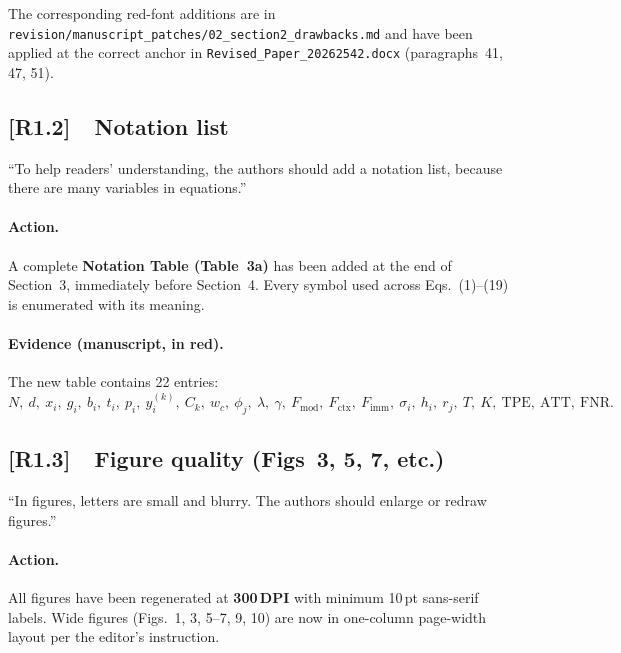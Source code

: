 \documentclass[11pt,a4paper]{article}
\newcommand{\cid}[1]{\textcolor{revred}{\textbf{[#1]}}}
\newcommand{\filebox}[1]{\texttt{\small #1}}
\newcommand{\sectref}[1]{Section~#1}
\newcommand{\stress}[1]{\textbf{#1}}
\begin{document}
\noindent The corresponding red-font additions are in \filebox{revision/manuscript\_patches/02\_section2\_drawbacks.md} and have been applied at the correct anchor in \filebox{Revised\_Paper\_20262542.docx} (paragraphs~41, 47, 51).

\subsection*{\cid{R1.2}~~Notation list}

\begin{reviewerquote}
``To help readers' understanding, the authors should add a notation list, because there are many variables in equations.''
\end{reviewerquote}

\paragraph{Action.} A complete \stress{Notation Table (Table~3a)} has been added at the end of \sectref{3}, immediately before \sectref{4}. Every symbol used across Eqs.~(1)--(19) is enumerated with its meaning.

\paragraph{Evidence (manuscript, in red).} The new table contains 22 entries:
\[
N,\ d,\ x_i,\ g_i,\ b_i,\ t_i,\ p_i,\ y_i^{(k)},\ C_k,\ w_c,\ \phi_j,\ \lambda,\ \gamma,\ F_{\text{mod}},\ F_{\text{ctx}},\ F_{\text{imm}},\ \sigma_i,\ h_i,\ r_j,\ T,\ K,\ \text{TPE},\ \text{ATT},\ \text{FNR}.
\]


\subsection*{\cid{R1.3}~~Figure quality (Figs~3, 5, 7, etc.)}

\begin{reviewerquote}
``In figures, letters are small and blurry. The authors should enlarge or redraw figures.''
\end{reviewerquote}

\paragraph{Action.} All figures have been regenerated at \stress{300\,DPI} with minimum 10\,pt sans-serif labels. Wide figures (Figs.~1, 3, 5--7, 9, 10) are now in one-column page-width layout per the editor's instruction. 
\end{document}
